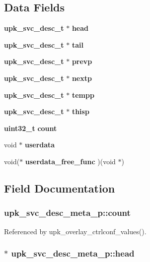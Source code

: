 \subsection*{Data Fields}
\begin{DoxyCompactItemize}
\item 
{\bf upk\_\-svc\_\-desc\_\-t} $\ast$ {\bf head}
\item 
{\bf upk\_\-svc\_\-desc\_\-t} $\ast$ {\bf tail}
\item 
{\bf upk\_\-svc\_\-desc\_\-t} $\ast$ {\bf prevp}
\item 
{\bf upk\_\-svc\_\-desc\_\-t} $\ast$ {\bf nextp}
\item 
{\bf upk\_\-svc\_\-desc\_\-t} $\ast$ {\bf tempp}
\item 
{\bf upk\_\-svc\_\-desc\_\-t} $\ast$ {\bf thisp}
\item 
{\bf uint32\_\-t} {\bf count}
\item 
void $\ast$ {\bf userdata}
\item 
void($\ast$ {\bf userdata\_\-free\_\-func} )(void $\ast$)
\end{DoxyCompactItemize}


\subsection{Field Documentation}
\subsubsection[{count}]{ {\bf upk\_\-svc\_\-desc\_\-meta\_\-p::count}}\label{structupk__svc__desc__meta__p_a86a2f12f4b8df7d47e1a219ffbc35077}


Referenced by upk\_\-overlay\_\-ctrlconf\_\-values().

\subsubsection[{head}]{ $\ast$ {\bf upk\_\-svc\_\-desc\_\-meta\_\-p::head}}\label{structupk__svc__desc__meta__p_ad075fba47ccb84904e12f97a5b94eff0}
